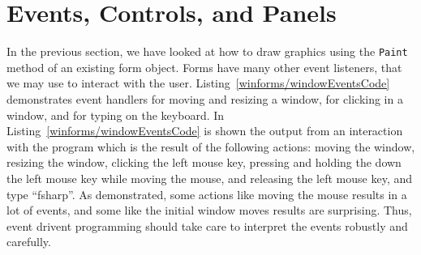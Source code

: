 \section{Events, Controls, and Panels}
In the previous section, we have looked at how to draw graphics using the \lstinline!Paint! method of an existing form object. Forms have many other event listeners, that we may use to interact with the user. Listing~\ref{winforms/windowEventsCode} demonstrates event handlers for moving and resizing a window, for clicking in a window, and for typing on the keyboard.
%
%
%
In Listing~\ref{winforms/windowEventsCode} is shown the output from an interaction with the program which is the result of the following actions: moving the window, resizing the window, clicking the left mouse key, pressing and holding the down the left mouse key while moving the mouse, and releasing the left mouse key, and type ``fsharp''. As demonstrated, some actions like moving the mouse results in a lot of events, and some like the initial window moves results are surprising. Thus, event drivent programming should take care to interpret the events robustly and carefully.

